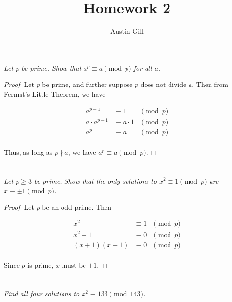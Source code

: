 \documentclass[12pt]{article}
\title{Homework 2}
\author{Austin Gill}
\begin{document}
\maketitle

\section{} \textit{Let $p$ be prime. Show that $a^p \equiv a \pmod{p}$ for all $a$.}

    \begin{proof}
        Let $p$ be prime, and further suppose $p$ does not divide $a$. Then from Fermat's Little Theorem, we have

        \begin{align*}
            a^{p - 1} &\equiv 1 &\pmod{p}\\
            a \cdot a^{p - 1} &\equiv a \cdot 1 &\pmod{p}\\
            a^p &\equiv a &\pmod{p}\\
        \end{align*}

        Thus, as long as $p \nmid a$, we have $a^p \equiv a \pmod{p}$.
    \end{proof}

\section{} \textit{Let $p \geq 3$ be prime. Show that the only solutions to $x^2 \equiv 1 \pmod{p}$ are $x \equiv \pm 1 \pmod{p}$.}

    \begin{proof}
        Let $p$ be an odd prime. Then

        \begin{align*}
            x^2 &\equiv 1 &\pmod{p}\\
            x^2 - 1 &\equiv 0 &\pmod{p}\\
            (x + 1)(x - 1) &\equiv 0 &\pmod{p}\\
        \end{align*}

        Since $p$ is prime, $x$ must be $\pm 1$.
    \end{proof}

\section{}
    \subsection{} \textit{Find all four solutions to $x^2 \equiv 133 \pmod{143}$.}
\end{document}
